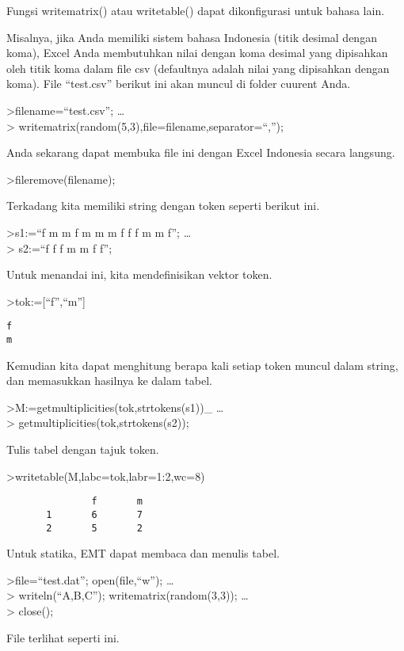 \documentclass[
]{book}
\begin{document}
Fungsi writematrix() atau writetable() dapat dikonfigurasi untuk bahasa lain.

Misalnya, jika Anda memiliki sistem bahasa Indonesia (titik desimal dengan koma), Excel Anda membutuhkan nilai dengan koma desimal yang dipisahkan oleh titik koma dalam file csv (defaultnya adalah nilai yang dipisahkan dengan koma). File ``test.csv'' berikut ini akan muncul di folder cuurent Anda.

\textgreater filename=``test.csv''; \ldots{}\\
\textgreater{} writematrix(random(5,3),file=filename,separator=``,'');

Anda sekarang dapat membuka file ini dengan Excel Indonesia secara langsung.

\textgreater fileremove(filename);

Terkadang kita memiliki string dengan token seperti berikut ini.

\textgreater s1:=``f m m f m m m f f f m m f''; \ldots{}\\
\textgreater{} s2:=``f f f m m f f'';

Untuk menandai ini, kita mendefinisikan vektor token.

\textgreater tok:={[}``f'',``m''{]}

\begin{verbatim}
f
m
\end{verbatim}

Kemudian kita dapat menghitung berapa kali setiap token muncul dalam string, dan memasukkan hasilnya ke dalam tabel.

\textgreater M:=getmultiplicities(tok,strtokens(s1))\_ \ldots{}\\
\textgreater{} getmultiplicities(tok,strtokens(s2));

Tulis tabel dengan tajuk token.

\textgreater writetable(M,labc=tok,labr=1:2,wc=8)

\begin{verbatim}
               f       m
       1       6       7
       2       5       2
\end{verbatim}

Untuk statika, EMT dapat membaca dan menulis tabel.

\textgreater file=``test.dat''; open(file,``w''); \ldots{}\\
\textgreater{} writeln(``A,B,C''); writematrix(random(3,3)); \ldots{}\\
\textgreater{} close();

File terlihat seperti ini.
\end{document}
